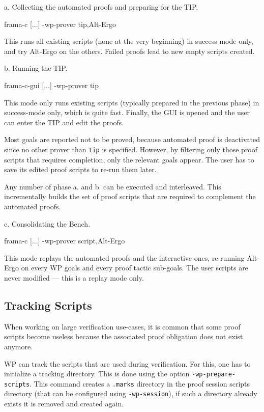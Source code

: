 a. Collecting the automated proofs and preparing for the TIP.
\begin{logs}
  frama-c [...] -wp-prover tip,Alt-Ergo
\end{logs}

This runs all existing scripts (none at the very beginning) in success-mode only, and try Alt-Ergo on the others. Failed proofs lead to new empty scripts created.

b. Running the TIP.
\begin{logs}
  frama-c-gui [...] -wp-prover tip
\end{logs}

This mode only runs existing scripts (typically prepared in the previous phase) in success-mode only, which is quite fast. Finally, the GUI is opened and the user can enter the TIP and edit the proofs.

Most goals are reported not to be proved, because automated proof is deactivated since no other prover than \verb+tip+ is specified. However, by filtering only those proof scripts that requires completion, only the relevant goals appear. The user has to save its edited proof scripts to re-run them later.

Any number of phase a. and b. can be executed and interleaved. This incrementally builds the set of proof scripts that are required to complement the automated proofs.

c. Consolidating the Bench.
\begin{logs}
  frama-c [...] -wp-prover script,Alt-Ergo
\end{logs}

This mode replays the automated proofs and the interactive ones, re-running Alt-Ergo on every \textsf{WP} goals and every proof tactic sub-goals. The user scripts are never modified — this is a replay mode only.

\subsection{Tracking Scripts}

When working on large verification use-cases, it is common that some proof scripts
become useless because the associated proof obligation does not exist anymore.

WP can track the scripts that are used during verification. For this, one has to
initialize a tracking directory. This is done using the option
\verb+-wp-prepare-scripts+. This command creates a \verb+.marks+ directory in the
proof session scripts directory (that can be configured using \verb+-wp-session+),
if such a directory already exists it is removed and created again.

